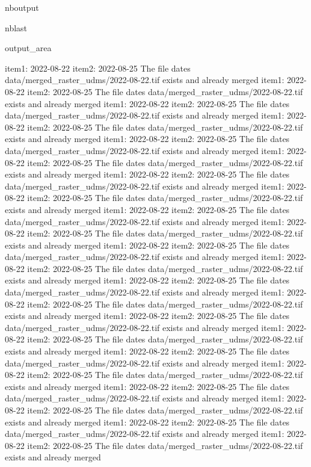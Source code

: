 \documentclass[letterpaper,10pt]{sphinxmanual}
\begin{document}
\begin{sphinxuseclass}{nboutput}
\begin{sphinxuseclass}{nblast}
{\begin{sphinxuseclass}{output_area}
\begin{sphinxuseclass}{}
\begin{sphinxVerbatim}[commandchars=\\\{\}]
item1:  2022-08-22
item2:  2022-08-25
The file dates data/merged\_raster\_udms/2022-08-22.tif exists and already merged
item1:  2022-08-22
item2:  2022-08-25
The file dates data/merged\_raster\_udms/2022-08-22.tif exists and already merged
item1:  2022-08-22
item2:  2022-08-25
The file dates data/merged\_raster\_udms/2022-08-22.tif exists and already merged
item1:  2022-08-22
item2:  2022-08-25
The file dates data/merged\_raster\_udms/2022-08-22.tif exists and already merged
item1:  2022-08-22
item2:  2022-08-25
The file dates data/merged\_raster\_udms/2022-08-22.tif exists and already merged
item1:  2022-08-22
item2:  2022-08-25
The file dates data/merged\_raster\_udms/2022-08-22.tif exists and already merged
item1:  2022-08-22
item2:  2022-08-25
The file dates data/merged\_raster\_udms/2022-08-22.tif exists and already merged
item1:  2022-08-22
item2:  2022-08-25
The file dates data/merged\_raster\_udms/2022-08-22.tif exists and already merged
item1:  2022-08-22
item2:  2022-08-25
The file dates data/merged\_raster\_udms/2022-08-22.tif exists and already merged
item1:  2022-08-22
item2:  2022-08-25
The file dates data/merged\_raster\_udms/2022-08-22.tif exists and already merged
item1:  2022-08-22
item2:  2022-08-25
The file dates data/merged\_raster\_udms/2022-08-22.tif exists and already merged
item1:  2022-08-22
item2:  2022-08-25
The file dates data/merged\_raster\_udms/2022-08-22.tif exists and already merged
item1:  2022-08-22
item2:  2022-08-25
The file dates data/merged\_raster\_udms/2022-08-22.tif exists and already merged
item1:  2022-08-22
item2:  2022-08-25
The file dates data/merged\_raster\_udms/2022-08-22.tif exists and already merged
item1:  2022-08-22
item2:  2022-08-25
The file dates data/merged\_raster\_udms/2022-08-22.tif exists and already merged
item1:  2022-08-22
item2:  2022-08-25
The file dates data/merged\_raster\_udms/2022-08-22.tif exists and already merged
item1:  2022-08-22
item2:  2022-08-25
The file dates data/merged\_raster\_udms/2022-08-22.tif exists and already merged
item1:  2022-08-22
item2:  2022-08-25
The file dates data/merged\_raster\_udms/2022-08-22.tif exists and already merged
item1:  2022-08-22
item2:  2022-08-25
The file dates data/merged\_raster\_udms/2022-08-22.tif exists and already merged
item1:  2022-08-22
item2:  2022-08-25
The file dates data/merged\_raster\_udms/2022-08-22.tif exists and already merged
item1:  2022-08-22
item2:  2022-08-25
The file dates data/merged\_raster\_udms/2022-08-22.tif exists and already merged
item1:  2022-08-22
item2:  2022-08-25
The file dates data/merged\_raster\_udms/2022-08-22.tif exists and already merged

\end{sphinxVerbatim}
\end{sphinxuseclass}
\end{sphinxuseclass}}
\end{sphinxuseclass}
\end{sphinxuseclass}
\end{document}

